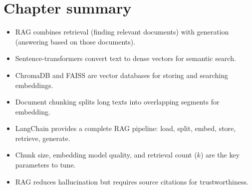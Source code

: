 \section{Chapter summary}

\begin{itemize}
  \item RAG combines retrieval (finding relevant documents) with generation (answering based on those documents).
  \item Sentence-transformers convert text to dense vectors for semantic search.
  \item ChromaDB and FAISS are vector databases for storing and searching embeddings.
  \item Document chunking splits long texts into overlapping segments for embedding.
  \item LangChain provides a complete RAG pipeline: load, split, embed, store, retrieve, generate.
  \item Chunk size, embedding model quality, and retrieval count ($k$) are the key parameters to tune.
  \item RAG reduces hallucination but requires source citations for trustworthiness.
\end{itemize}
